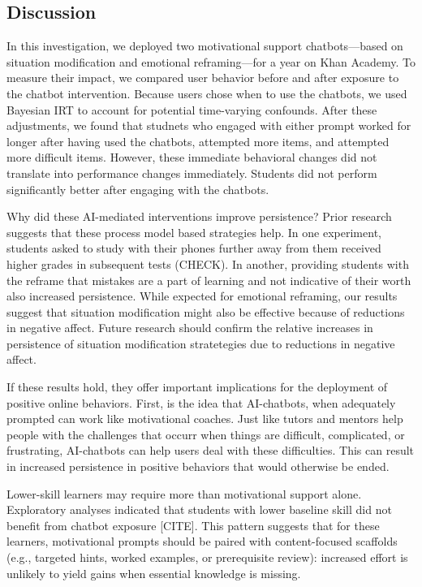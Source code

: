 \documentclass[11pt]{report}
\begin{document}
\begin{mainf}
\section{Discussion} 

In this investigation, we deployed two motivational support chatbots---based on situation modification and emotional reframing---for a year on Khan Academy. 
To measure their impact, we compared user behavior before and after exposure to the chatbot intervention.
Because users chose when to use the chatbots, we used Bayesian IRT to account for potential time-varying confounds.
After these adjustments, we found that studnets who engaged with either prompt worked for longer after having used the chatbots, attempted more items, and attempted more difficult items.
However, these immediate behavioral changes did not translate into performance changes immediately.
Students did not perform significantly better after engaging with the chatbots.

Why did these AI-mediated interventions improve persistence?
Prior research suggests that these process model based strategies help.
In one experiment, students asked to study with their phones further away from them received higher grades in subsequent tests (CHECK).
In another, providing students with the reframe that mistakes are a part of learning and not indicative of their worth also increased persistence. 
While expected for emotional reframing, our results suggest that situation modification might also be effective because of reductions in negative affect.
Future research should confirm the relative increases in persistence of situation modification stratetegies due to reductions in negative affect.

If these results hold, they offer important implications for the deployment of positive online behaviors.
First, is the idea that AI-chatbots, when adequately prompted can work like motivational coaches.
Just like tutors and mentors help people with the challenges that occurr when things are difficult, complicated, or frustrating, AI-chatbots can help users deal with these difficulties.
This can result in increased persistence in positive behaviors that would otherwise be ended.

Lower-skill learners may require more than motivational support alone.
Exploratory analyses indicated that students with lower baseline skill did not benefit from chatbot exposure [CITE].
This pattern suggests that for these learners, motivational prompts should be paired with content-focused scaffolds (e.g., targeted hints, worked examples, or prerequisite review): increased effort is unlikely to yield gains when essential knowledge is missing.


\end{mainf}
\end{document}
